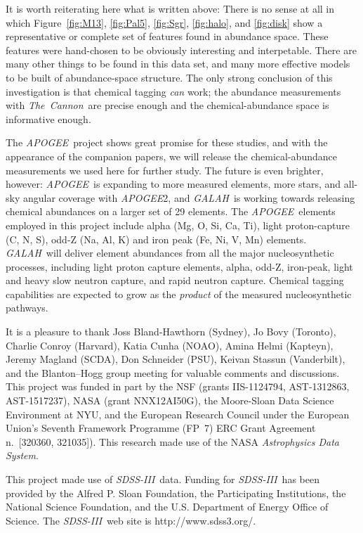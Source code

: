 \documentclass[manuscript, letterpaper]{aastex6}
\newcommand{\acronym}[1]{{\small{#1}}}
\newcommand{\project}[1]{\textsl{#1}}
\newcommand{\sdssiii}{\project{\acronym{SDSS-III}}}
\newcommand{\apogee}{\project{\acronym{APOGEE}}}
\newcommand{\galah}{\project{\acronym{GALAH}}}
\newcommand{\thecannon}{\project{The~Cannon}}
\renewcommand{\figurename}{Figure} %
\begin{document}
It is worth reiterating here what is written above:
There is no sense at all in which \figurename~\ref{fig:M13},
\ref{fig:Pal5}, \ref{fig:Sgr}, \ref{fig:halo}, and \ref{fig:disk} show
a representative or complete set of features found in abundance space.
These features were hand-chosen to be obviously interesting and
interpetable.
There are many other things to be found in this data set, and many
more effective models to be built of abundance-space structure.
The only strong conclusion of this investigation is that chemical
tagging \emph{can} work; the abundance measurements with \thecannon\ are
precise enough and the chemical-abundance space is informative enough.

The \apogee\ project shows great promise for these studies, and with
the appearance of the companion papers, we will release the
chemical-abundance measurements we used here for further study.
The future is even brighter, however: \apogee\ is expanding to more measured
elements, more stars, and all-sky angular coverage with \apogee2, and
\galah\ is working towards releasing chemical abundances on a larger set
of 29 elements.
The \apogee\ elements employed in this project include alpha
(Mg, O, Si, Ca, Ti), light proton-capture (C, N, S), odd-Z (Na, Al, K)
and iron peak (Fe, Ni, V, Mn) elements.
\galah\ will deliver element abundances from all the major
nucleosynthetic processes, including light proton capture elements,
alpha, odd-Z, iron-peak, light and heavy slow neutron capture, and
rapid neutron capture.
Chemical tagging capabilities are expected to grow as the
\emph{product} of the measured nucleosynthetic pathways.

\acknowledgements
It is a pleasure to thank
  Joss Bland-Hawthorn (Sydney),
  Jo Bovy (Toronto),
  Charlie Conroy (Harvard),
  Katia Cunha (\acronym{NOAO}),
  Amina Helmi (Kapteyn),
  Jeremy Magland (\acronym{SCDA}),
  Don Schneider (\acronym{PSU}),
  Keivan Stassun (Vanderbilt),
  and the Blanton--Hogg group meeting
for valuable comments and discussions.
This project was funded in part by
  the \acronym{NSF} (grants \acronym{IIS-1124794}, \acronym{AST-1312863}, \acronym{AST-1517237}),
  \acronym{NASA} (grant \acronym{NNX12AI50G}),
  the Moore-Sloan Data Science Environment at \acronym{NYU}, and
  the European Research Council under the
  European Union's Seventh Framework Programme (FP~7)
  \acronym{ERC} Grant Agreement n.~\acronym{[320360, 321035]}).
This research made use of the \acronym{NASA} \project{Astrophysics Data System}.

This project made use of \sdssiii\ data.
Funding for \sdssiii\ has been provided by the Alfred P. Sloan
Foundation, the Participating Institutions, the National Science
Foundation, and the \acronym{U.S.} Department of Energy Office of Science. The
\sdssiii\ web site is http://www.sdss3.org/.
\end{document}
